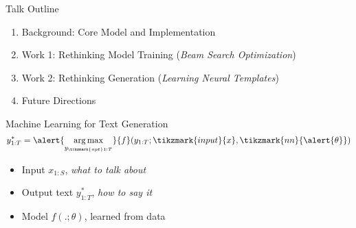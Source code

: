 \begin{frame}{Talk Outline}

  \begin{enumerate}
  \item Background: Core Model and Implementation
    \air
  \item Work 1: Rethinking Model Training (\textit{Beam Search Optimization})
    \air

  \item Work 2: Rethinking  Generation  (\textit{Learning Neural Templates})
    \air

  \item Future Directions
  \end{enumerate}
\end{frame}








\begin{frame}{Machine Learning for Text Generation}
    \[ {y^*_{1:T}} = \alert{\argmax_{y_{\tikzmark{opt}1:T}}} {f}(y_{1:T}; \tikzmark{input}{x}, \tikzmark{nn}{\alert{\theta}}) \]


  \begin{itemize}

  \item Input {$x_{1:S}$},  \textit{what to talk about}
    \air

  \item Output text {$y^*_{1:T}$}, \textit{how to say it}
    \air

  \item Model {$f(.; \theta)$}, learned from data
  \end{itemize}
\end{frame}


